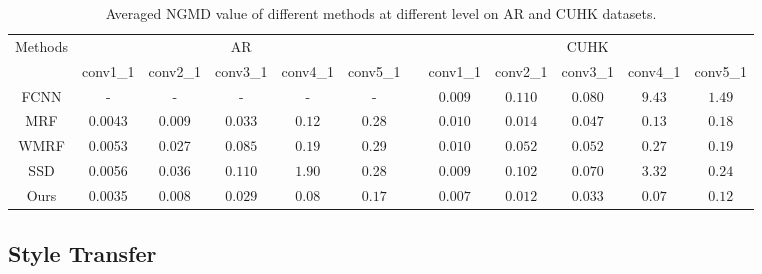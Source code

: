 \documentclass[10pt,twocolumn,letterpaper]{article}
\begin{document}
\begin{table*}[htbp]
\begin{center}
{\small
\begin{tabular}{ccccccccccccc}
\hline
\multicolumn{2}{c|}{\multirow {2}{*}{Methods}} &\multicolumn{5}{c}{AR} & & \multicolumn{5}{c}{CUHK} \\
\cline{3-7} \cline{9-13} \multicolumn{2}{c|}{} & conv1\_1 & conv2\_1 & conv3\_1 & conv4\_1 & conv5\_1 & &
 conv1\_1 & conv2\_1 & conv3\_1 & conv4\_1 & conv5\_1  \\
\hline
\multicolumn{2}{c|}{FCNN} & - & - & - & - & - & & { $0.009$} &{ $0.110$} & {$0.080$} & {$9.43$} & {$1.49$}  \\
\multicolumn{2}{c|}{MRF} & 0.0043 & 0.009 & {$0.033$}  & {$0.12$} & 0.28 & & { $0.010$} &{ $0.014$} & {$0.047$} & $0.13$ & $0.18$  \\
\multicolumn{2}{c|}{WMRF} & 0.0053 & 0.027 & {$0.085$}  & {$0.19$} & 0.29 & & { $0.010$} &{ $0.052$} & {$0.052$} & {$0.27$} & {$0.19$}  \\
\multicolumn{2}{c|}{SSD} & 0.0056 & 0.036 & {$0.110$} & {$1.90$} & 0.28 & & { $0.009$} &{ $0.102$} & {$0.070$} & {$3.32$} & {$0.24$}  \\
\multicolumn{2}{c|}{Ours} & {\color{red} 0.0035} & {\color{red} 0.008} & {\color{red} $0.029$} & {\color{red} $0.08$} & {\color{red} $0.17$} & & {\color{red}$0.007$} &{\color{red} $0.012$} & {\color{red} $0.033$} & {\color{red} $0.07$} & {\color{red} $0.12$}  \\
\hline
\end{tabular}
}
\end{center}
\caption{Averaged NGMD value of different methods at different level on AR and CUHK datasets.}
\label{tab:NGMD}
\end{table*}
{
\subsection{Style Transfer}
}
\end{document}
